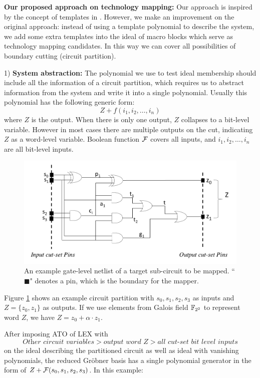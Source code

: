 {\bf Our proposed approach on technology mapping:}
Our approach is inspired by the concept of templates in \cite{sankaranarayanan2004non}. 
However, we make an improvement on the original approach:
instead of using a template polynomial to describe the system, we add some extra templates into the ideal
of macro blocks which serve as technology mapping candidates. In this way we can cover all possibilities
of boundary cutting (circuit partition).

1) {\bf System abstraction:}
The polynomial we use to test ideal membership should include all the information of a circuit partition,
which requires us to abstract information from the system and write it into a single polynomial.
Usually this polynomial has the following generic form:
$$Z + f(i_1,i_2,\dots,i_n)$$
where $Z$ is the output. When there is only one output, $Z$ collapses to a bit-level variable. However in most
cases there are multiple outputs on the cut, indicating $Z$ as a word-level variable. Boolean function ${\mathcal{F}}$ covers
all inputs, and $i_1,i_2,\dots,i_n$ are all bit-level inputs.

\begin{figure}[h]
	\begin{center}
	\includegraphics[width=\textwidth]{newfig/tobemapped.pdf}
	\end{center}
	\caption{An example gate-level netlist of a target sub-circuit to be mapped. ``$\blacksquare$" denotes a pin, 
	which is the boundary for the mapper.}
	\label{fig:tobemapped}
\end{figure}

Figure \ref{fig:tobemapped} shows an example circuit partition with $s_0,s_1,s_2,s_3$ as inputs and
$Z = \{z_0,z_1\}$ as outputs. If we use elements from Galois field ${\mathbb{F}}_{2^2}$ to represent word $Z$,
we have $Z = z_0 + \alpha\cdot z_1$.

After imposing ATO of LEX with
$$\textit{Other\ circuit\ variables} > \textit{output\ word\ } Z > \textit{all\ cut-set\ bit\ level\ inputs}$$
on the ideal describing the partitioned circuit as well as ideal with vanishing polynomials,
the reduced Gr\"obner basis has a single polynomial generator in the form of $Z + {\mathcal{F}}(s_0,s_1,s_2,s_3)$.
In this example:

